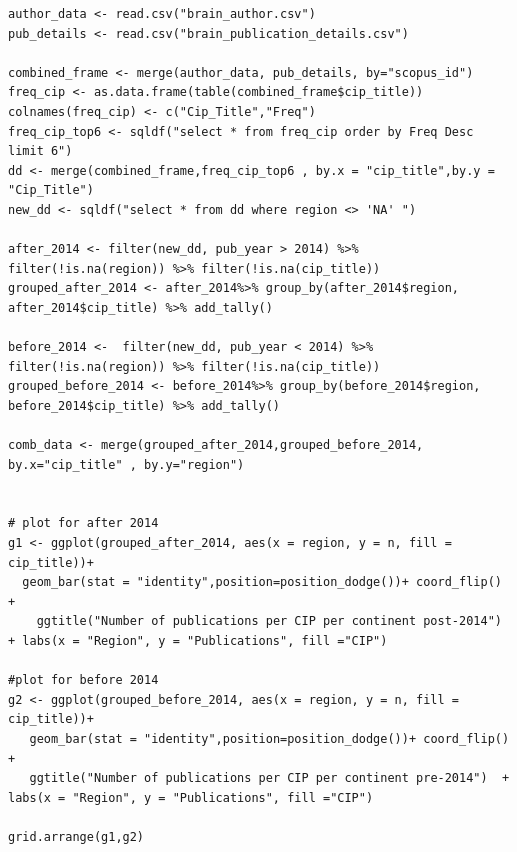 \documentclass[a4paper,11pt]{article}
\theoremstyle{mytheor}
\begin{document}
\begin{lstlisting}[label={list:first},caption=Generating bar plot of the number of publications per CIP category per continent]
author_data <- read.csv("brain_author.csv")
pub_details <- read.csv("brain_publication_details.csv")

combined_frame <- merge(author_data, pub_details, by="scopus_id")
freq_cip <- as.data.frame(table(combined_frame$cip_title))
colnames(freq_cip) <- c("Cip_Title","Freq")
freq_cip_top6 <- sqldf("select * from freq_cip order by Freq Desc limit 6")
dd <- merge(combined_frame,freq_cip_top6 , by.x = "cip_title",by.y = "Cip_Title")
new_dd <- sqldf("select * from dd where region <> 'NA' ")

after_2014 <- filter(new_dd, pub_year > 2014) %>% filter(!is.na(region)) %>% filter(!is.na(cip_title))
grouped_after_2014 <- after_2014%>% group_by(after_2014$region, after_2014$cip_title) %>% add_tally()

before_2014 <-  filter(new_dd, pub_year < 2014) %>% filter(!is.na(region)) %>% filter(!is.na(cip_title))
grouped_before_2014 <- before_2014%>% group_by(before_2014$region, before_2014$cip_title) %>% add_tally()

comb_data <- merge(grouped_after_2014,grouped_before_2014, by.x="cip_title" , by.y="region")


# plot for after 2014 
g1 <- ggplot(grouped_after_2014, aes(x = region, y = n, fill = cip_title))+
  geom_bar(stat = "identity",position=position_dodge())+ coord_flip() +
    ggtitle("Number of publications per CIP per continent post-2014") + labs(x = "Region", y = "Publications", fill ="CIP")

#plot for before 2014
g2 <- ggplot(grouped_before_2014, aes(x = region, y = n, fill = cip_title))+
   geom_bar(stat = "identity",position=position_dodge())+ coord_flip() +
   ggtitle("Number of publications per CIP per continent pre-2014")  + labs(x = "Region", y = "Publications", fill ="CIP")

grid.arrange(g1,g2)

\end{lstlisting}
\end{document}
